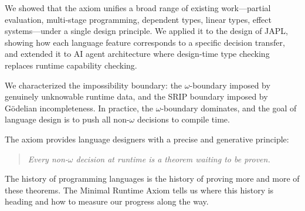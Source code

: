 \documentclass[11pt]{article}
\begin{document}
We showed that the axiom unifies a broad range of existing work---partial evaluation,
multi-stage programming, dependent types, linear types, effect systems---under a single
design principle. We applied it to the design of JAPL, showing how each language feature
corresponds to a specific decision transfer, and extended it to AI agent architecture
where design-time type checking replaces runtime capability checking.

We characterized the impossibility boundary: the $\omega$-boundary imposed by genuinely
unknowable runtime data, and the SRIP boundary imposed by G\"{o}delian incompleteness.
In practice, the $\omega$-boundary dominates, and the goal of language design is to push
all non-$\omega$ decisions to compile time.

The axiom provides language designers with a precise and generative principle:

\begin{quote}
\emph{Every non-$\omega$ decision at runtime is a theorem waiting to be proven.}
\end{quote}

The history of programming languages is the history of proving more and more of these
theorems. The Minimal Runtime Axiom tells us where this history is heading and how to
measure our progress along the way.
\end{document}
